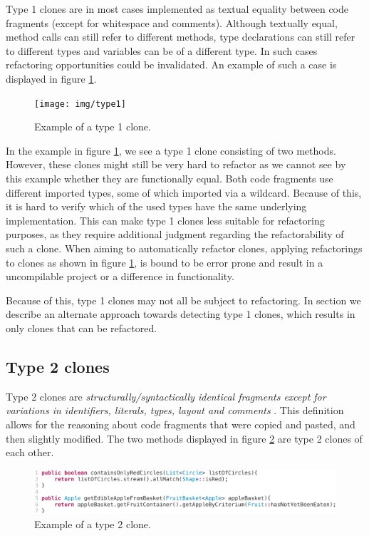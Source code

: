 Type 1 clones are in most cases implemented as textual equality between code fragments (except for whitespace and comments). Although textually equal, method calls can still refer to different methods, type declarations can still refer to different types and variables can be of a different type. In such cases refactoring opportunities could be invalidated. An example of such a case is displayed in figure \ref{fig:type1}.

\begin{figure}[H]
  \texttt{[image: img/type1]}
  \caption{Example of a type 1 clone.}
  \label{fig:type1}
\end{figure}

In the example in figure \ref{fig:type1}, we see a type 1 clone consisting of two methods. However, these clones might still be very hard to refactor as we cannot see by this example whether they are functionally equal. Both code fragments use different imported types, some of which imported via a wildcard. Because of this, it is hard to verify which of the used types have the same underlying implementation. This can make type 1 clones less suitable for refactoring purposes, as they require additional judgment regarding the refactorability of such a clone. When aiming to automatically refactor clones, applying refactorings to clones as shown in figure \ref{fig:type1}, is bound to be error prone and result in a uncompilable project or a difference in functionality.

Because of this, type 1 clones may not all be subject to refactoring. In section \label{chap:type1rclones} we describe an alternate approach towards detecting type 1 clones, which results in only clones that can be refactored.

\subsection{Type 2 clones}
Type 2 clones are \textit{structurally/syntactically identical fragments except for variations in identifiers, literals, types, layout and comments} \cite{roy2007survey}. This definition allows for the reasoning about code fragments that were copied and pasted, and then slightly modified. The two methods displayed in figure \ref{fig:type2} are type 2 clones of each other.

\begin{figure}[H]
  \includegraphics[width=1\columnwidth]{img/type2}
  \caption{Example of a type 2 clone.}
  \label{fig:type2}
\end{figure}

